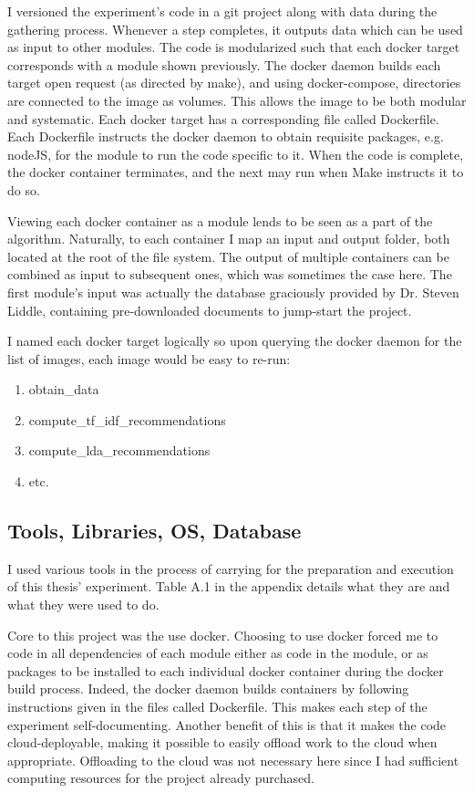 I versioned the experiment’s code in a git project along with data during the gathering process. Whenever a step completes, it outputs data which can be used as input to other modules. The code is modularized such that each docker target corresponds with a module shown previously. The docker daemon builds each target open request (as directed by make), and using docker-compose, directories are connected to the image as volumes. This allows the image to be both modular and systematic. Each docker target has a corresponding file called Dockerfile. Each Dockerfile instructs the docker daemon to obtain requisite packages, e.g. nodeJS, for the module to run the code specific to it. When the code is complete, the docker container terminates, and the next may run when Make instructs it to do so.

Viewing each docker container as a module lends to be seen as a part of the algorithm. Naturally, to each container I map an input and output folder, both located at the root of the file system. The output of multiple containers can be combined as input to subsequent ones, which was sometimes the case here. The first module’s input was actually the database graciously provided by Dr. Steven Liddle, containing pre-downloaded documents to jump-start the project.

I named each docker target logically so upon querying the docker daemon for the list of images, each image would be easy to re-run:

\begin{enumerate}
  \item obtain\_data
  \item compute\_tf\_idf\_recommendations
  \item compute\_lda\_recommendations
  \item etc.
\end{enumerate}

\subsection{Tools, Libraries, OS, Database}
I used various tools in the process of carrying for the preparation and execution of this thesis’ experiment. Table A.1 in the appendix details what they are and what they were used to do.

Core to this project was the use docker. Choosing to use docker forced me to code in all dependencies of each module either as code in the module, or as packages to be installed to each individual docker container during the docker build process. Indeed, the docker daemon builds containers by following instructions given in the files called Dockerfile. This makes each step of the experiment self-documenting. Another benefit of this is that it makes the code cloud-deployable, making it possible to easily offload work to the cloud when appropriate. Offloading to the cloud was not necessary here since I had sufficient computing resources for the project already purchased.

